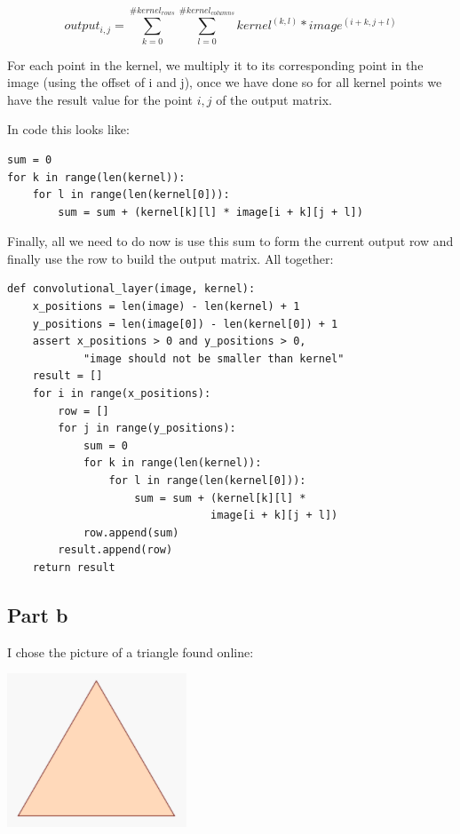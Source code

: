 \documentclass[10pt]{article}
\begin{document}
\begin{equation*}
    output_{i,j} = \sum_{k = 0}^{\#kernel_{rows}}\sum_{l = 0}^{\#kernel_{columns}} kernel^{(k,l)} * image^{(i + k, j + l)}
\end{equation*}

For each point in the kernel, we multiply it to its corresponding point in the image (using the offset
of i and j), once we have done so for all kernel points we have the result value for the
point ${i,j}$ of the output matrix.

In code this looks like:
\begin{lstlisting}
sum = 0
for k in range(len(kernel)):
    for l in range(len(kernel[0])):
        sum = sum + (kernel[k][l] * image[i + k][j + l])
\end{lstlisting}

Finally, all we need to do now is use this sum to form the current output row and
finally use the row to build the output matrix. All together:

\begin{lstlisting}
def convolutional_layer(image, kernel):
    x_positions = len(image) - len(kernel) + 1
    y_positions = len(image[0]) - len(kernel[0]) + 1
    assert x_positions > 0 and y_positions > 0, 
            "image should not be smaller than kernel"
    result = []
    for i in range(x_positions):
        row = []
        for j in range(y_positions):
            sum = 0
            for k in range(len(kernel)):
                for l in range(len(kernel[0])):
                    sum = sum + (kernel[k][l] * 
                                image[i + k][j + l])
            row.append(sum)
        result.append(row)
    return result
\end{lstlisting}

\subsection*{Part b}
I chose the picture of a triangle found online:

\begin{center}
    \includegraphics[scale=0.3]{triangle.PNG}
\end{center}
\end{document}

